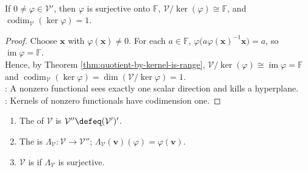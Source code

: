 \begin{corollary} \label{cor:nonzero-functional-hyperplane-kernel} \\
If $0\neq\varphi\in\mathcal{V}'$, then $\varphi$ is surjective onto $\mathbb{F}$, $\mathcal{V}/\ker(\varphi)\cong\mathbb{F}$, and $\operatorname{codim}_{\mathcal{V}}(\ker\varphi)=1$.
\begin{proof}
Choose $\mathbf{x}$ with $\varphi(\mathbf{x})\neq0$. For each $a\in\mathbb{F}$, $\varphi\bigl(a\varphi(\mathbf{x})^{-1}\mathbf{x}\bigr)=a$, so $\operatorname{im}\varphi=\mathbb{F}$.\\
Hence, by Theorem \ref{thm:quotient-by-kernel-is-range}, $\mathcal{V}/\ker(\varphi)\cong\operatorname{im}\varphi=\mathbb{F}$ and $\operatorname{codim}_{\mathcal{V}}(\ker\varphi)=\dim(\mathcal{V}/\ker\varphi)=1$.\\
: A nonzero functional sees exactly one scalar direction and kills a hyperplane.\\
: Kernels of nonzero functionals have codimension one.
\end{proof}
\end{corollary}

\begin{definition} \label{def:algebraic-double-dual-and-natural-map} 
\begin{enumerate}[label=(\roman*)]
\setlength{\itemsep}{0pt}
\item The  of $\mathcal{V}$ is $\mathcal{V}''\defeq(\mathcal{V}')'$.
\item The  is $\Lambda_{\mathcal{V}}:\mathcal{V}\to\mathcal{V}''$; $\Lambda_{\mathcal{V}}(\mathbf{v})(\varphi)=\varphi(\mathbf{v})$.
\item $\mathcal{V}$ is  if $\Lambda_{\mathcal{V}}$ is surjective.
\end{enumerate}
\end{definition}

